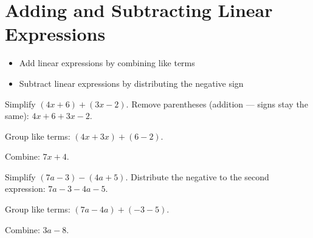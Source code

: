 \section{Adding and Subtracting Linear Expressions}

\begin{stepGoal}
\begin{itemize}
    \item Add linear expressions by combining like terms
    \item Subtract linear expressions by distributing the negative sign
\end{itemize}
\end{stepGoal}

\begin{stepVocabBox}
\end{stepVocabBox}

\begin{stepsCard}
\end{stepsCard}

\begin{stepExample}{Simplify $(4x + 6) + (3x - 2)$.}
     Remove parentheses (addition --- signs stay the same): $4x + 6 + 3x - 2$.

     Group like terms: $(4x + 3x) + (6 - 2)$.

     Combine: $7x + 4$.
\end{stepExample}

\begin{stepExample}{Simplify $(7a - 3) - (4a + 5)$.}
     Distribute the negative to the second expression: $7a - 3 - 4a - 5$.

     Group like terms: $(7a - 4a) + (-3 - 5)$.

     Combine: $3a - 8$.
\end{stepExample}


